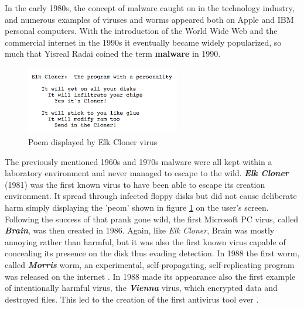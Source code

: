 \documentclass[pdfa%
,cucitura%
]{toptesi}
\begin{document}
In the early 1980s, the concept of malware caught on in the technology industry, and numerous examples of viruses and worms appeared both on Apple and IBM personal computers. With the introduction of the World Wide Web and the commercial internet in the 1990s it eventually became widely popularized, so much that Yisreal Radai coined the term \textbf{malware} in 1990.

\begin{figure}[h!]
	\centering
	\includegraphics[width=0.6\textwidth]{./images/elk_cloner_example.png}
	\caption[Poem displayed by Elk Cloner virus]{Poem displayed by Elk Cloner virus}
	\label{fig:elkClonerExample}
\end{figure}

The previously mentioned 1960s and 1970s malware were all kept within a laboratory environment and never managed to escape to the wild. \textbf{\textit{Elk Cloner}} (1981) was the first known virus to have been able to escape its creation environment. It spread through infected floppy disks but did not cause deliberate harm simply displaying the 'peom' shown in figure \ref{fig:elkClonerExample} on the user's screen. Following the success of that prank gone wild, the first Microsoft PC virus, called \textbf{\textit{Brain}}, was then created in 1986. Again, like \textit{Elk Cloner}, Brain was mostly annoying rather than harmful, but it was also the first known virus capable of concealing its presence on the disk thus evading detection. In 1988 the first worm, called \textbf{\textit{Morris}} worm, an experimental, self-propagating, self-replicating program was released on the internet \cite{NamanyaTWM}. In 1988 made its appearance also the first example of intentionally harmful virus, the \textbf{\textit{Vienna}} virus, which encrypted data and destroyed files. This led to the creation of the first antivirus tool ever \cite{ReganWIM}.
\end{document}
